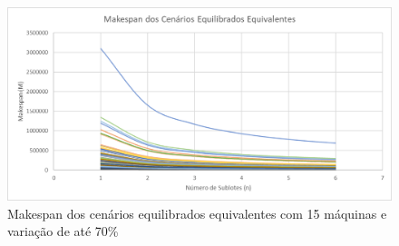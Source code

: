 \begin{figure}[!ht]
    \centering
    \includegraphics[width=12cm]{Resultados/Figuras/Meq15_70}
    \caption{Makespan dos cenários equilibrados equivalentes com 15 máquinas e variação de até 70\%}
    \label{fig:Meq15_70}
\end{figure}